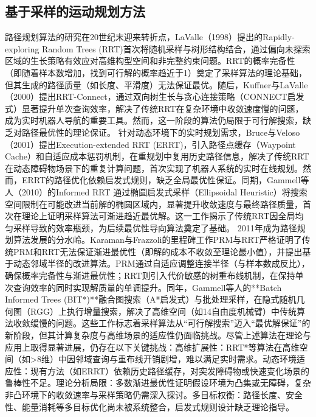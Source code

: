 \documentclass[master,academic]{ysuthesis} %
\begin{document}
		\subsection{基于采样的运动规划方法}
		路径规划算法的研究在20世纪末迎来转折点，LaValle（1998）提出的Rapidly-exploring Random Trees (RRT)​ 首次将随机采样与树形结构结合，通过偏向未探索区域的生长策略有效应对高维构型空间和非完整约束问题。RRT的概率完备性​（即随着样本数增加，找到可行解的概率趋近于1）奠定了采样算法的理论基础，但其生成的路径质量（如长度、平滑度）无法保证最优。随后，Kuffner与LaValle（2000）提出RRT-Connect，通过双向树生长与贪心连接策略（CONNECT启发式）显著提升单次查询效率，解决了传统RRT在复杂环境中收敛速度慢的问题，成为实时机器人导航的重要工具。然而，这一阶段的算法仍局限于可行解搜索，缺乏对路径最优性的理论保证。
		针对动态环境下的实时规划需求，Bruce与Veloso（2001）提出Execution-extended RRT (ERRT)，引入路径点缓存（Waypoint Cache）和自适应成本惩罚机制，在重规划中复用历史路径信息，解决了传统RRT在动态障碍物场景下的重复计算问题，首次实现了机器人系统的实时在线规划。然而，ERRT的路径优化依赖启发式规则，缺乏全局最优性保证。同期，Gammell等人（2010）的Informed RRT​ 通过椭圆启发式采样（Ellipsoidal Heuristic）将搜索空间限制在可能改进当前解的椭圆区域内，显著提升收敛速度与最终路径质量，首次在理论上证明采样算法可渐进趋近最优解。这一工作揭示了传统RRT因全局均匀采样导致的效率瓶颈，为后续最优性导向算法奠定了基础。
		2011年成为路径规划算法发展的分水岭。Karaman与Frazzoli的里程碑工作PRM与RRT​ 严格证明了传统PRM和RRT无法保证渐进最优性（即解的成本不收敛至理论最小值），并提出基于动态邻域半径的改进算法。PRM通过自适应调整连接半径（与样本数成反比），确保概率完备性与渐进最优性；RRT则引入代价敏感的树重布线机制，在保持单次查询效率的同时实现解质量的单调提升。同年，Gammell等人的**Batch Informed Trees (BIT*)**​ 融合图搜索（A*启发式）与批处理采样，在隐式随机几何图（RGG）上执行增量搜索，解决了高维空间（如14自由度机械臂）中传统算法收敛缓慢的问题。这些工作标志着采样算法从“可行解搜索”迈入“最优解保证”的新阶段，但其计算复杂度与高维场景的适应性仍面临挑战。尽管上述算法在理论与应用上取得显著进展，仍存在以下关键挑战：
		​高维扩展性：RRT*等算法在高维空间（如>8维）中因邻域查询与重布线开销剧增，难以满足实时需求。
		​动态环境适应性：现有方法（如ERRT）依赖历史路径缓存，对突发障碍物或快速变化场景的鲁棒性不足。
		​理论分析局限：多数渐进最优性证明假设环境为凸集或无障碍，复杂非凸环境下的收敛速率与采样策略仍需深入探讨。
		​多目标权衡：路径长度、安全性、能量消耗等多目标优化尚未被系统整合，启发式规则设计缺乏理论指导。
\end{document}

